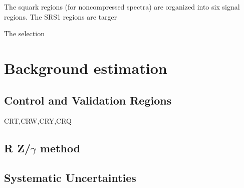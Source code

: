 The squark regions (for noncompressed spectra) are organized into six signal regions.
The SRS1 regions are targer

The selection



\section{Background estimation}

\subsection{Control and Validation Regions}

CRT,CRW,CRY,CRQ

\subsection{R Z/$\gamma$ method}

\subsection{Systematic Uncertainties}
